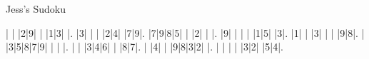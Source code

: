 Jess's Sudoku\vspace{0.2cm}

\begin{sudoku-block}| | |2|9| | |1|3| |.
|3| | | |2|4| |7|9|.
|7|9|8|5| | |2| | |.
|9| | | | |1|5| |3|.
|1| | |3| | | |9|8|.
| |3|5|8|7|9| | | |.
| | |3|4|6| | |8|7|.
| |4| | |9|8|3|2| |.
| | | | |3|2| |5|4|.
\end{sudoku-block}